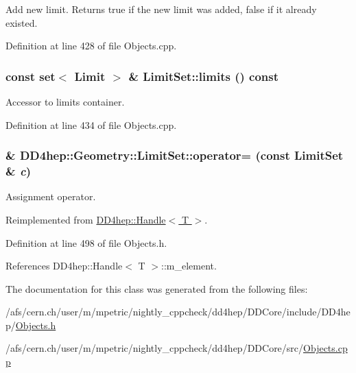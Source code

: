 Add new limit. Returns true if the new limit was added, false if it already existed. 

Definition at line 428 of file Objects.cpp.\hypertarget{class_d_d4hep_1_1_geometry_1_1_limit_set_a5c175414806164d6cac89b749d08d909}{
\subsubsection[{limits}]{\setlength{\rightskip}{0pt plus 5cm}const {\bf set}$<$ {\bf Limit} $>$ \& LimitSet::limits () const}}
\label{class_d_d4hep_1_1_geometry_1_1_limit_set_a5c175414806164d6cac89b749d08d909}


Accessor to limits container. 

Definition at line 434 of file Objects.cpp.\hypertarget{class_d_d4hep_1_1_geometry_1_1_limit_set_a6590b625e57c2c92da40c8cf0528d45f}{
\subsubsection[{operator=}]{\& DD4hep::Geometry::LimitSet::operator= (const {\bf LimitSet} \& {\em c})}}
\label{class_d_d4hep_1_1_geometry_1_1_limit_set_a6590b625e57c2c92da40c8cf0528d45f}


Assignment operator. 

Reimplemented from \hyperlink{class_d_d4hep_1_1_handle_a9bbf8f498df42e81ad26fb00233505a6}{DD4hep::Handle$<$ T $>$}.

Definition at line 498 of file Objects.h.

References DD4hep::Handle$<$ T $>$::m\_\-element.

The documentation for this class was generated from the following files:\begin{DoxyCompactItemize}
\item 
/afs/cern.ch/user/m/mpetric/nightly\_\-cppcheck/dd4hep/DDCore/include/DD4hep/\hyperlink{_objects_8h}{Objects.h}\item 
/afs/cern.ch/user/m/mpetric/nightly\_\-cppcheck/dd4hep/DDCore/src/\hyperlink{_objects_8cpp}{Objects.cpp}\end{DoxyCompactItemize}
